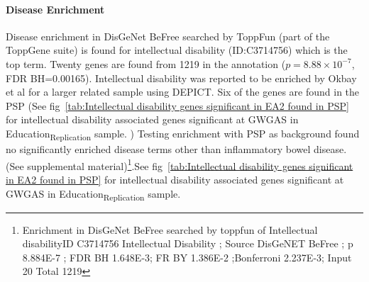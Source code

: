 

  \paragraph{Disease Enrichment}
  
  Disease enrichment in DisGeNet BeFree\cite{pinero2020disgenet} searched by ToppFun (part of the ToppGene suite) is found for intellectual disability (ID:C3714756) which is the top term. Twenty genes are found from 1219 in the annotation ($p=8.88\times10^{-7}$, FDR BH=0.00165). Intellectual disability was reported to be enriched by Okbay et al \cite{okbay2016genome} for a larger related sample using DEPICT. Six of the genes are found in the PSP (See fig~\ref{tab:Intellectual disability genes significant in EA2 found in PSP} for intellectual disability associated genes significant at GWGAS in Education\textsubscript{Replication} sample. ) Testing enrichment with PSP as background found no significantly enriched disease terms other than inflammatory bowel disease. (See supplemental material)\footnote{Enrichment in DisGeNet BeFree searched by toppfun of Intellectual disabilityID C3714756 	Intellectual Disability ; Source	DisGeNET BeFree ; p 	8.884E-7 ; FDR BH	1.648E-3; FR BY 	1.386E-2 ;Bonferroni	2.237E-3; Input 	20 	Total 1219}.See fig~\ref{tab:Intellectual disability genes significant in EA2 found in PSP} for intellectual disability associated genes significant at GWGAS in Education\textsubscript{Replication} sample. 
        
